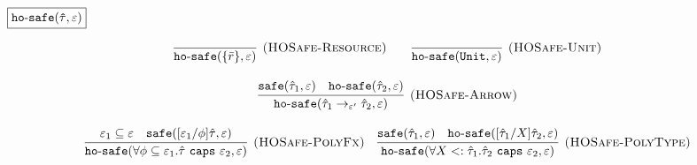 \documentclass{llncs}
\newcommand{\keywadj}[1]{\mathtt{#1}}
\newcommand{\keyw}[1]{\keywadj{#1}~}
\newcommand{\kw}[1]{\keyw{ #1 }}
\newcommand{\kwa}[1]{\keywadj{ #1 }}
\newcommand{\hyphen}{\hbox{-}}
\newcommand{\safe}[2]{ \kwa{safe}(#1, #2) }
\newcommand{\hosafe}[2]{ \kwa{ho \hyphen safe}(#1, #2) }
\newcommand{\polycap}[3]{
	\forall #1. #2~ \kw{caps} #3
}
\newcommand{\ispoly}[1]{
	\kwa{is \hyphen poly}(#1)
}
\begin{document}
\noindent
$\fbox{$\kwa{ho \hyphen safe(\hat \tau, \varepsilon)}$}$

\[
\begin{array}{c}

\infer[\textsc{(HOSafe-Resource)}]
	{ \kwa{ho \hyphen safe}( \{ \bar r \}, \varepsilon)} 
	{}
	~~~~~~
\infer[\textsc{(HOSafe-Unit)}]
	{ \kwa{ho \hyphen safe}( \kwa{Unit}, \varepsilon)} 
	{}\\[3ex]

\infer[\textsc{(HOSafe-Arrow)}]
	{ \kwa{ho \hyphen safe}( \hat \tau_1 \rightarrow_{\varepsilon'} \hat \tau_2, \varepsilon ) }
	{ \kwa{safe}(\hat \tau_1, \varepsilon)  & \kwa{ho \hyphen safe}(\hat \tau_2, \varepsilon) }\\[3ex]

\infer[\textsc{(HOSafe-PolyFx)}]
	{\hosafe{\polycap{\phi \subseteq \varepsilon_1}{\hat \tau}{\varepsilon_2}}{\varepsilon}}
	{\varepsilon_1 \subseteq \varepsilon & \safe{[\varepsilon_1/\phi]\hat \tau}{\varepsilon} } ~~~

\infer[\textsc{(HOSafe-PolyType)}]
	{\hosafe{\polycap{X <: \hat \tau_1}{\hat \tau_2}{\varepsilon_2}}{\varepsilon}}
	{ \safe{\hat \tau_1}{\varepsilon} & \hosafe{[\hat \tau_1/X]\hat \tau_2}{\varepsilon} }

\end{array}
\]









\fbox{$\hat \Gamma \vdash \hat \tau <: \hat \tau$}
\end{document}
